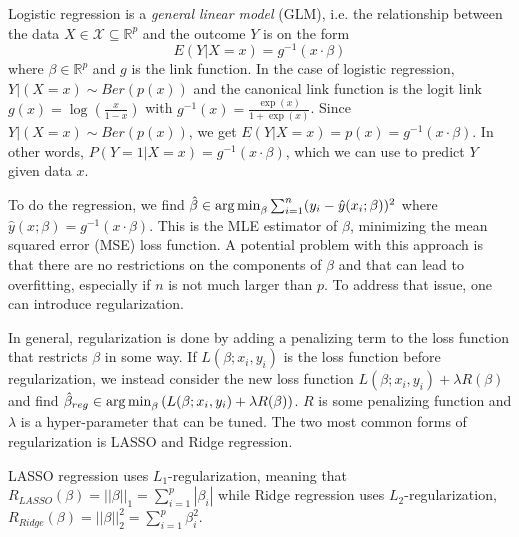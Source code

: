 \documentclass[../../project.tex]{subfiles}
\begin{document}
	Logistic regression is a \textit{general linear model} (GLM), i.e. the relationship between the data $X \in \mathcal{X} \subseteq \mathbb{R}^p$ and the outcome $Y$ is on the form
	\begin{equation}
	E(Y|X=x) = g^{-1}(x \cdot \beta)
	\end{equation}
	where $\beta \in \mathbb{R}^p$ and $g$ is the link function. In the case of logistic regression, $Y|(X = x) \sim Ber(p(x))$ and the canonical link function is the logit link $g(x) = \log \left( \frac{x}{1 - x} \right)$ with $g^{-1}(x) = \frac{\exp(x)}{1 + \exp(x)}$. Since $Y|(X=x) \sim Ber(p(x))$, we get $E(Y|X=x) = p(x) = g^{-1}(x \cdot \beta)$. In other words, $P(Y = 1 | X = x) = g^{-1}(x \cdot \beta)$, which we can use to predict $Y$ given data $x$.
	
	To do the regression, we find $\hat \beta \in \operatorname*{arg\,min}_\beta \sum_{i=1}^{n} (y_i - \hat y(x_i; \beta))^2$ where $\hat y(x;\beta) = g^{-1} (x \cdot \beta)$. This is the MLE estimator of $\beta$, minimizing the mean squared error (MSE) loss function. A potential problem with this approach is that there are no restrictions on the components of $\beta$ and that can lead to overfitting, especially if $n$ is not much larger than $p$. To address that issue, one can introduce regularization.
	
	In general, regularization is done by adding a penalizing term to the loss function that restricts $\beta$ in some way. If $L(\beta; x_i,y_i)$ is the loss function before regularization, we instead consider the new loss function $L(\beta; x_i,y_i) + \lambda R(\beta)$ and find $\hat \beta_{reg} \in \operatorname*{arg\,min}_\beta \left( L(\beta; x_i, y_i) + \lambda R(\beta) \right)$. $R$ is some penalizing function and $\lambda$ is a hyper-parameter that can be tuned. The two most common forms of regularization is LASSO and Ridge regression.
	
	LASSO regression uses $L_1$-regularization, meaning that $R_{LASSO}(\beta) = ||\beta||_1 =  \sum_{i=1}^{p} |\beta_i|$ while Ridge regression uses $L_2$-regularization, $R_{Ridge}(\beta) = ||\beta||_2^2 = \sum_{i=1}^{p} \beta_i^2$.
	
\end{document}

